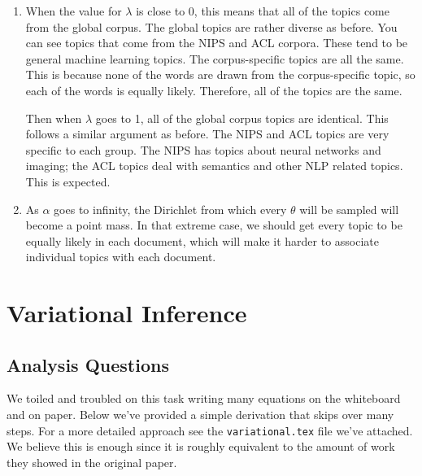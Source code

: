 \documentclass[11pt,a4paper]{article}
\begin{document}
\begin{enumerate}
\begin{enumerate}
			\item 
			
			When the value for $\lambda$ is close to 0, this means that all of
			the topics come from the global corpus. The global topics are rather
			diverse as before. You can see topics that come from the NIPS
			and ACL corpora. These tend to be general machine learning topics.
			The corpus-specific topics are all the same. This is because none
			of the words are drawn from the corpus-specific topic, so each  of
			the words is equally likely. Therefore, all of the topics are the same.
			
			Then when $\lambda$ goes to 1, all of the global corpus topics
			are identical. This follows a similar argument as before. The NIPS
			and ACL topics are very specific to each group. The NIPS has topics
			about neural networks and imaging; the ACL topics deal with
			semantics and other NLP related topics. This is expected.
			
			\item As $\alpha$ goes to infinity, the Dirichlet from which every $\theta$ 
			will be sampled will become a point mass.
			In that extreme case, we should get
			every topic to be equally likely in each document, which will make it
			harder to associate individual topics with each document.
		\end{enumerate}
	\end{enumerate}
	
	\section{Variational Inference}
	\subsection{Analysis Questions}
	
	We toiled and troubled on this task writing many equations on the whiteboard and on paper. Below we've provided a simple derivation that skips over many steps. For a more detailed approach see the \texttt{variational.tex} file we've attached. We believe this is enough since it is roughly equivalent to the amount of work they showed in the original paper.
\\ \\
\end{document}
